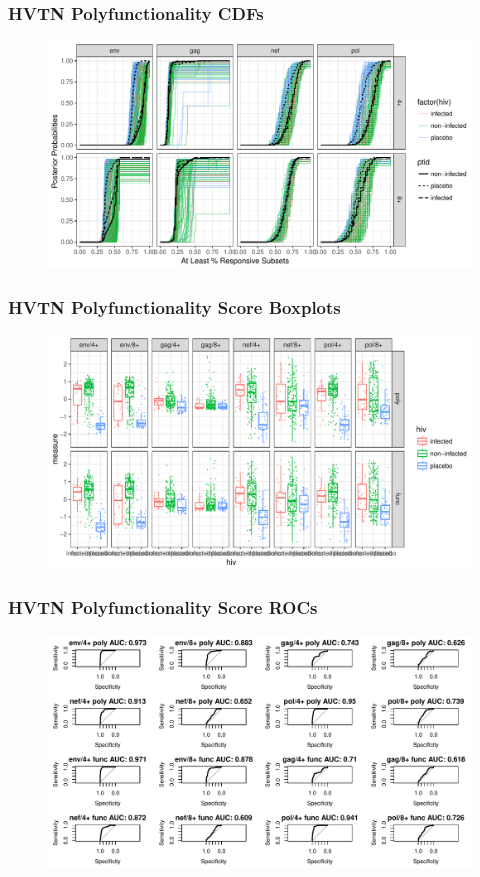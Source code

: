 \documentclass{beamer}
\theoremstyle{definition}
\begin{document}

\begin{frame}
\frametitle{HVTN Polyfunctionality CDFs}
\begin{figure}[]
\includegraphics[width=11 cm]{figures/HVTNpolyOnlyCDF}
\end{figure}
\end{frame}


\begin{frame}
\frametitle{HVTN Polyfunctionality Score Boxplots}
\begin{figure}
\includegraphics[width=11 cm]{figures/HVTNfuncbox}
\end{figure}
\end{frame}


\begin{frame}
\frametitle{HVTN Polyfunctionality Score ROCs}
\begin{figure}
\includegraphics[width=11 cm]{figures/HVTNpolyROC}
\end{figure}
\end{frame}
\end{document}
